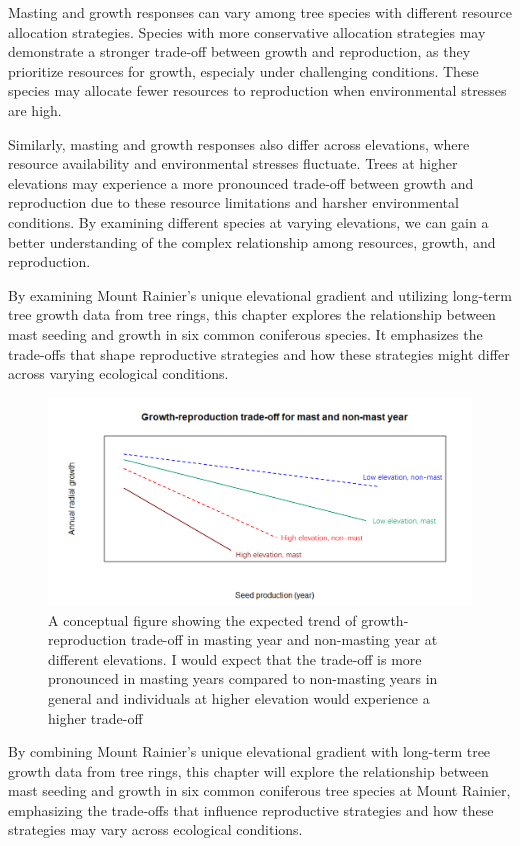 \documentclass[11pt,letter]{article}
\begin{document}
Masting and growth responses can vary among tree species with different resource allocation strategies. Species with more conservative allocation strategies may demonstrate a stronger trade-off between growth and reproduction, as they prioritize resources for growth, especialy under challenging conditions. These species may allocate fewer resources to reproduction when environmental stresses are high.\par
Similarly, masting and growth responses also differ across elevations, where resource availability and environmental stresses fluctuate. Trees at higher elevations may experience a more pronounced trade-off between growth and reproduction due to these resource limitations and harsher environmental conditions. By examining different species at varying elevations, we can gain a better understanding of the complex relationship among resources, growth, and reproduction.\par
By examining Mount Rainier's unique elevational gradient and utilizing long-term tree growth data from tree rings, this chapter explores the relationship between mast seeding and growth in six common coniferous species. It emphasizes the trade-offs that shape reproductive strategies and how these strategies might differ across varying ecological conditions.
\begin{figure}[htb]
	\centering
	\includegraphics[width=1\linewidth]{conceptualFigureChap2.png}
	\caption{A conceptual figure showing the expected trend of growth-reproduction trade-off in masting year and non-masting year at different elevations. I would expect that the trade-off is more pronounced in masting years compared to non-masting years in general and individuals at higher elevation would experience a higher trade-off}
	\label{fig:conceptual2}
\end{figure}
By combining Mount Rainier's unique elevational gradient with long-term tree growth data from tree rings, this chapter will explore the relationship between mast seeding and growth in six common coniferous tree species at Mount Rainier, emphasizing the trade-offs that influence reproductive strategies and how these strategies may vary across ecological conditions.\par
\end{document}
